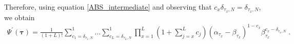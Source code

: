 \documentclass[10pt]{article}
\numberwithin{equation}{section}
\numberwithin{equation}{subsection}
\newcommand{\dt}{\;.}
\begin{document}
\begin{comment}
The product $\left(\mathcal{S}_{2}^{-1}\right)^{\otimes L}|\Psi^{''}\rangle$ gives a vector $|\Psi^{'}\rangle$ whose component are denoted by $\Psi^{'}(\bm{\tau})$. 
To find these quantities we need to fix the rows correspondent to $\bm{\tau}$ in the matrix $\left(\mathcal{S}_{2}^{-1}\right)^{\otimes L}$. Consider a string $\bm{\tau}=(\tau_{1},\ldots,\tau_{L})$ with $\tau_{1},\ldots,\tau_{L}\in \{1,\ldots,N\}$, then the corresponding row reads
\begin{equation}
	\begin{split}
\left(\mathcal{S}_{2}^{-1}\right)^{\otimes L}_{\bm{\tau}}&=\,e_{\tau_{1},\ldots,\tau_{L}}^{\tau_{1},\ldots,\tau_{L}}+\sum_{q_{1}=1}^{L}(1-\delta_{\tau_{q_{1}},N})e_{\tau_{1},\ldots,\tau_{L}}^{\varphi_{1}^{1},\ldots,\varphi_{L}^{1}}\beta_{\tau_{q_{1}}}\\&+\sum_{q_{1},q_{2}=1\,:\,q_{1}\neq q_{2}}^{L}(1-\delta_{\tau_{q_{1}},N})(1-\delta_{\tau_{q_{2}},N})e_{\tau_{1},\ldots,\tau_{L}}^{\varphi_{1}^{2},\ldots,\varphi_{L}^{2}}\beta_{\tau_{q_{1}}}\beta_{\tau_{q_{2}}}
  \\&+
  \ldots+\sum_{q_{1},\ldots,q_{L}=1\,:\,q_{i}\neq q_{j}\;\text{if}\;i\neq j}^{L}\left(\prod_{x=1}^{L}(1-\delta_{\tau_{x},N})\right)\left(\beta_{\tau_{x}}\right)^{1-\delta_{\tau_{x},1}}e_{\tau_{1},\ldots,\tau_{L}}^{\varphi_{1}^{L},\ldots,\varphi_{L}^{L}}
	\end{split}
\end{equation}
\end{comment}
Therefore, using equation \eqref{ABS_intermediate} and observing that $c_{x}\delta_{\tau_{x},N} =\delta_{\tau_{x},N}$, we obtain 
\begin{equation}\label{elementsABS}
	\begin{split}
		\Psi^{'}(\bm{\tau})=\frac{1}{(1+L)!}\sum_{c_{1}=\delta_{\tau_{1},N}}^{1}\ldots\sum_{c_{L}=\delta_{\tau_{L},N}}^{1}\prod_{x=1}^{L}\left(1+\sum_{j=x}^{L}c_{j}\right)(\alpha_{\tau_{x}}-\beta_{\tau_{x}})^{1-c_{x}}\beta_{\tau_{x}}^{c_{x}-\delta_{\tau_{x},N}}\dt
	\end{split}
\end{equation} 
\end{document}
